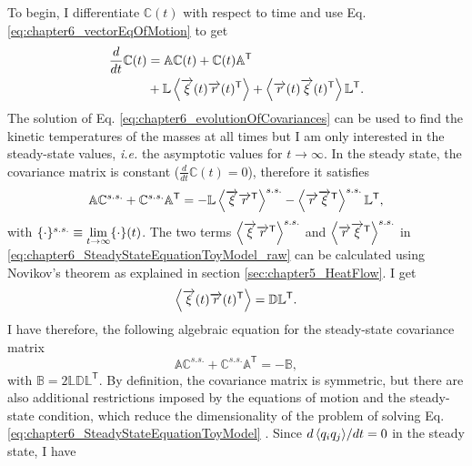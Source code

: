 To begin, I differentiate $\mathbb{C}(t)$ with respect to time and use Eq. \eqref{eq:chapter6_vectorEqOfMotion} to get
%
\begin{align}
  \frac{d}{dt}\mathbb{C}(t) &=
  \mathbb{A}\mathbb{C}(t) +
  \mathbb{C}(t) \mathbb{A}^\mathsf{T}
  \nonumber\\
  &+
  \mathbb{L}\expval{ \overrightarrow{\xi}(t)\overrightarrow{r}(t)^\mathsf{T}}
+
  \expval{ \overrightarrow{r}(t)\overrightarrow{\xi}(t)^\mathsf{T}}\mathbb{L}^\mathsf{T}.
  \label{eq:chapter6_evolutionOfCovariances}
\end{align}
%
The solution of Eq. \eqref{eq:chapter6_evolutionOfCovariances} can be used to find the kinetic temperatures of the masses at all times but I am only interested in the steady-state values, \textit{i.e.} the asymptotic values for $t\to \infty$. In the steady state, the covariance matrix is constant ($\frac{d}{dt}\mathbb{C}(t)=0$), therefore it satisfies
%
\begin{equation}
  \mathbb{A}\mathbb{C}^{s.s.} +
  \mathbb{C}^{s.s.} \mathbb{A}^\mathsf{T}=
  - \mathbb{L}\expval{ \overrightarrow{\xi}\overrightarrow{r}^\mathsf{T}}^{s.s.}
  - \expval{ \overrightarrow{r}\overrightarrow{\xi}^\mathsf{T}}^{s.s.}\mathbb{L}^\mathsf{T},
  \label{eq:chapter6_SteadyStateEquationToyModel_raw}
\end{equation}
%
with $\small\{\cdot\small\}^{s.s.}\equiv \lim\limits_{t \to \infty} \small\{\cdot\small\}(t)$. The two terms $\expval{ \overrightarrow{\xi}\overrightarrow{r}^\mathsf{T}}^{s.s.}$ and  $\expval{\overrightarrow{r}\overrightarrow{\xi}^\mathsf{T}}^{s.s.}$ in \eqref{eq:chapter6_SteadyStateEquationToyModel_raw} can be calculated using Novikov's theorem \cite{Novikov1965} as explained in section \ref{sec:chapter5_HeatFlow}. I get
%
\begin{equation}
  \expval{ \overrightarrow{\xi}(t)\overrightarrow{r}(t)^\mathsf{T}} = \mathbb{D}\mathbb{L}^\mathsf{T}.
\end{equation}
%
I have therefore, the following algebraic equation for the steady-state covariance matrix
%
\begin{equation}
  \mathbb{A}\mathbb{C}^{s.s.} +
  \mathbb{C}^{s.s.}\mathbb{A}^\mathsf{T}
  =
  -\mathbb{B},
  \label{eq:chapter6_SteadyStateEquationToyModel}
\end{equation}
%
with $\mathbb{B} = 2 \mathbb{L}\mathbb{D}\mathbb{L}^\mathsf{T}$. By definition, the covariance matrix is  symmetric, but there are also  additional restrictions imposed by the equations of motion and the steady-state condition, which reduce the dimensionality of the problem of solving Eq. \eqref{eq:chapter6_SteadyStateEquationToyModel} \cite{Simon2019}. Since ${d \expval{ q_i q_j }}/{dt} = 0$ in the steady state, I have
